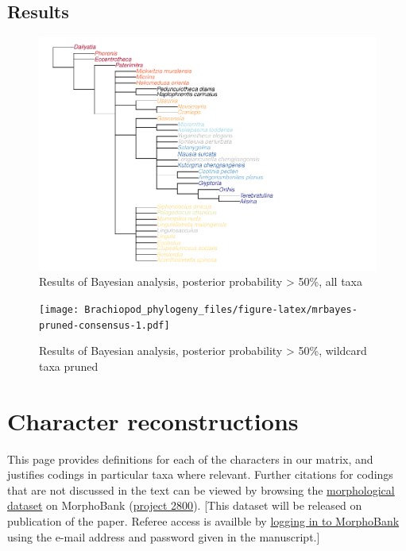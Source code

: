 \documentclass[openany]{book}
\begin{document}
\section{Results}\label{results-2}

\begin{figure}
\centering
\includegraphics{Brachiopod_phylogeny_files/figure-latex/mrbayes-full-consensus-1.pdf}
\caption{\label{fig:mrbayes-full-consensus}Results of Bayesian analysis,
posterior probability \textgreater{} 50\%, all taxa}
\end{figure}

\begin{figure}
\centering
\texttt{[image: Brachiopod\_phylogeny\_files/figure-latex/mrbayes-pruned-consensus-1.pdf]}
\caption{\label{fig:mrbayes-pruned-consensus}Results of Bayesian analysis,
posterior probability \textgreater{} 50\%, wildcard taxa pruned}
\end{figure}

\hypertarget{reconstructions}{\chapter{Character
reconstructions}\label{reconstructions}}

This page provides definitions for each of the characters in our matrix,
and justifies codings in particular taxa where relevant. Further
citations for codings that are not discussed in the text can be viewed
by browsing the \protect\hyperlink{dataset}{morphological dataset} on
MorphoBank (\href{https://morphobank.org/permalink/?P2800}{project
2800}). {[}This dataset will be released on publication of the paper.
Referee access is availble by
\href{https://morphobank.org/index.php/LoginReg/form}{logging in to
MorphoBank} using the e-mail address and password given in the
manuscript.{]}
\end{document}

